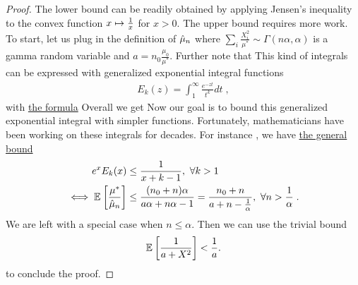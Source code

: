 \begin{subappendices}
\begin{proof}
	The lower bound can be readily obtained by applying Jensen's inequality 
	to the convex function $x\mapsto\frac{1}{x}$ for $x>0$.
	The upper bound requires more work.
	To start, let us plug in the definition of $\hat {\mu}_n$
	where  $\sum_i \frac{X_i^2}{ \mu^*} \sim \Gamma(n\alpha, \alpha)$ is a gamma random variable and $a=n_0 \frac{\mu_0}{\mu^*}$. 
	Further note that 
This kind of integrals can be expressed with {generalized exponential integral functions}
	\begin{align}
		E_k(z) = \int_1^\infty \frac{e^{-z t} }{t^k} dt \; ,
	\end{align}
with \href{http://dlmf.nist.gov/8.19.E4}{the formula} \citep[Eq.~8.19.4]{DLMF}
Overall we get
	Now our goal is to bound this generalized exponential integral with simpler functions.
	Fortunately, mathematicians have been working on these integrals for decades.
	For instance , we have \href{https://dlmf.nist.gov/8.19.E21}{the general bound} \citep[Eq.~8.19.21]{DLMF}
	\begin{align}
		e^x E_k(x) 
		&\leq \frac{1}{x + k - 1} , \ \forall k>1\\
		\iff \mathbb{E}_{} \left[ \frac{\mu^*}{\hat {\mu}_n} \right]  
		&\leq \frac{(n_0 +n)\alpha}{a\alpha + n\alpha - 1}
		= \frac{n_0 +n}{a + n - \frac{1}{\alpha}} , \ \forall n >\frac{1}{\alpha} \; .
	\end{align}
We are left with a special case when  $n\leq \alpha$. 
Then we can use the trivial bound 
\begin{align}
	\mathbb{E}_{} \left[ \frac{1}{a + X^2} \right]  < \frac{1}{a}.
	\label{eq:trivial_bound}
\end{align}
to conclude the proof.
\end{proof}


\end{subappendices}
